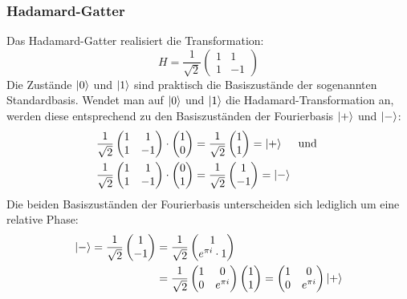 \subsubsection*{Hadamard-Gatter}
Das Hadamard-Gatter realisiert die Transformation:
\[
  H 
  =
  \frac{1}{\sqrt{2}}
  \begin{pmatrix}
    1 & 1 \\
    1 & -1
    \end{pmatrix}
\]
Die Zustände \(\ket{0}\) und \(\ket{1}\) sind praktisch die Basiszustände der sogenannten Standardbasis.
Wendet man auf \(\ket{0}\) und \(\ket{1}\) die Hadamard-Transformation an, 
werden diese entsprechend zu den Basiszuständen der Fourierbasis \(\ket{+}\) und \(\ket{-}\):
\begin{align*} 
  &\frac{1}{\sqrt{2}}
\begin{pmatrix}
  1 & 1 \\
  1 & -1
  \end{pmatrix}
  \cdot
  \begin{pmatrix}
    1 \\
    0
  \end{pmatrix}
  =
  \frac{1}{\sqrt{2}}
  \begin{pmatrix}
    1 \\
    1
  \end{pmatrix}
  =
  \ket{+}
  \quad\text{ und } \\
  &\frac{1}{\sqrt{2}}
  \begin{pmatrix}
    1 & 1 \\
    1 & -1
    \end{pmatrix}
    \cdot
    \begin{pmatrix}
      0 \\
      1
    \end{pmatrix}
    =
    \frac{1}{\sqrt{2}}
    \begin{pmatrix}
      1 \\
      -1
    \end{pmatrix}
    =
    \ket{-}
  \end{align*}
Die beiden Basiszuständen der Fourierbasis unterscheiden sich lediglich um eine relative Phase:
\begin{align*}
  \ket{-} =
  \frac{1}{\sqrt{2}}
  \begin{pmatrix}
    1 \\
   - 1
  \end{pmatrix} &= 
  \frac{1}{\sqrt{2}}
  \begin{pmatrix}
    1 \\
   e^{\pi i} \cdot 1
  \end{pmatrix} \\ &= 
  \frac{1}{\sqrt{2}}
  \begin{pmatrix}
    1 & 0 \\
    0 & e^{\pi i}
  \end{pmatrix}
  \begin{pmatrix}
    1 \\
    1
  \end{pmatrix} = 
  \begin{pmatrix}
    1 & 0 \\
    0 & e^{\pi i}
  \end{pmatrix}
  \ket{+}
  \end{align*}

